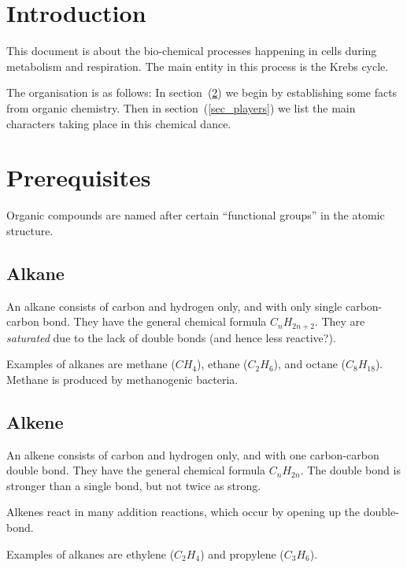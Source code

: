 \documentclass{article}
\begin{document}

\section{Introduction}

This document is about the bio-chemical processes happening in cells during metabolism and
respiration. The main entity in this process is the Krebs cycle.

The organisation is as follows: In section~(\ref{sec_prerequisites}) we begin by
establishing some facts from organic chemistry. Then in section~(\ref{sec_players})
we list the main characters taking place in this chemical dance.


\section{Prerequisites}\label{sec_prerequisites}

Organic compounds are named after certain ``functional groups'' in the atomic structure.

\subsection{Alkane}

An alkane consists of carbon and hydrogen only, and with only single carbon-carbon bond.
They have the general chemical formula $C_{n}H_{2n+2}$. They are {\em saturated\/}
due to the lack of double bonds (and hence less reactive?).

Examples of alkanes are methane ($CH_4$), ethane ($C_2H_6$), and octane ($C_{8}H_{18}$).
Methane is produced by methanogenic bacteria.

\subsection{Alkene}

An alkene consists of carbon and hydrogen only, and with one carbon-carbon double bond.
They have the general chemical formula $C_{n}H_{2n}$. The double bond is stronger than
a single bond, but not twice as strong.

Alkenes react in many addition reactions, which occur by opening up the double-bond.

Examples of alkanes are ethylene ($C_2H_4$) and propylene ($C_3H_6$).
\end{document}
